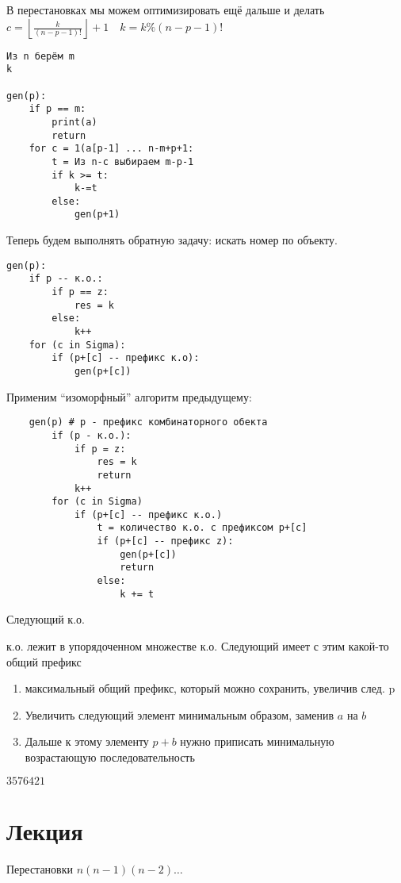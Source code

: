 \documentclass{book}
\theoremstyle{definition}
\begin{document}
В перестановках мы можем оптимизировать ещё дальше и делать $c = \left\lfloor \frac{k}{(n-p-1)!} \right\rfloor+1\quad k = k\%(n-p-1)!$

\begin{verbatim}
Из n берём m
k

gen(p):
    if p == m:
        print(a)
        return
    for c = 1(a[p-1] ... n-m+p+1:
        t = Из n-c выбираем m-p-1
        if k >= t:
            k-=t
        else:
            gen(p+1)
\end{verbatim}

Теперь будем выполнять обратную задачу: искать номер по объекту.

 \begin{verbatim}
gen(p):
    if p -- к.о.:
        if p == z:
            res = k
        else:
            k++
    for (c in Sigma):
        if (p+[c] -- префикс к.о):
            gen(p+[c])
\end{verbatim}

Применим ``изоморфный'' алгоритм предыдущему:
\begin{verbatim}
    gen(p) # p - префикс комбинаторного обекта
        if (p - к.о.):
            if p = z:
                res = k
                return
            k++
        for (c in Sigma) 
            if (p+[c] -- префикс к.о.)
                t = количество к.о. с префиксом p+[c]
                if (p+[c] -- префикс z):
                    gen(p+[c])
                    return
                else:
                    k += t
\end{verbatim}

Следующий к.о.

к.о. лежит в упорядоченном множестве к.о.  Следующий имеет с этим какой-то общий префикс

\begin{enumerate}
    \item максимальный общий префикс, который можно сохранить, увеличив след. p
    \item Увеличить следующий элемент минимальным образом, заменив $a$ на  $b$
    \item Дальше к этому элементу $p+b$ нужно приписать минимальную возрастающую последовательность
\end{enumerate}

$3576421$

\section{Лекция}
Перестановки $n(n-1)(n-2)\ldots$
\end{document}
